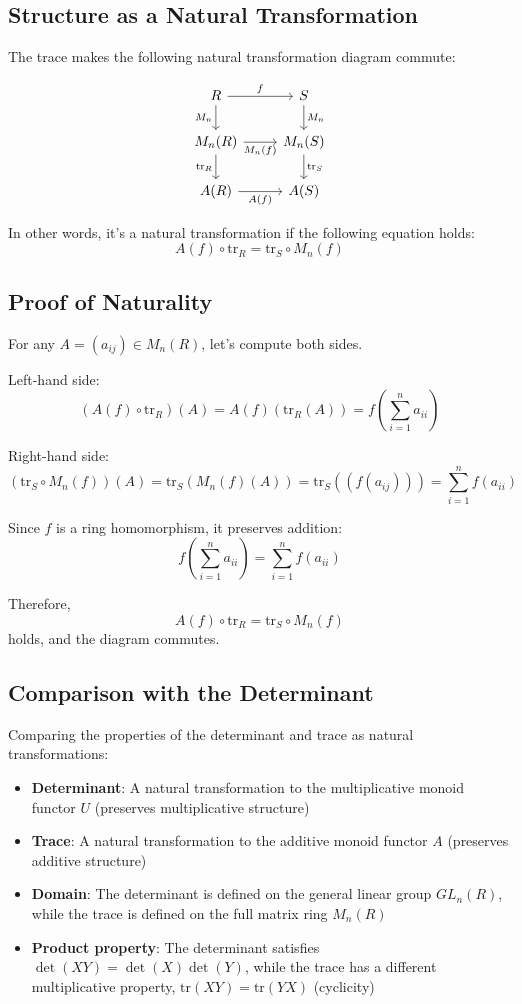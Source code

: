 \documentclass[uplatex,a4j,12pt,dvipdfmx]{jsarticle}
\begin{document}
\subsection{Structure as a Natural Transformation}

The trace makes the following natural transformation diagram commute:

\[
	\begin{tikzcd}
		R \arrow[r, "f"]
		\arrow[d, "M_n"']
		&
		S \arrow[d, "M_n"] \\
		M_n(R) \arrow[r, "M_n(f)"']
		\arrow[d, "\text{tr}_R"']
		&
		M_n(S) \arrow[d, "\text{tr}_S"] \\
		A(R) \arrow[r, "A(f)"']
		&
		A(S)
	\end{tikzcd}
\]

In other words, it's a natural transformation if the following equation holds:
\[
	A(f) \circ \text{tr}_R = \text{tr}_S \circ M_n(f)
\]

\subsection{Proof of Naturality}

For any $A = (a_{ij}) \in M_n(R)$, let's compute both sides.

Left-hand side:
\[
	(A(f) \circ \text{tr}_R)(A) = A(f)(\text{tr}_R(A)) = f\left(\sum_{i=1}^n a_{ii}\right)
\]

Right-hand side:
\[
	(\text{tr}_S \circ M_n(f))(A) = \text{tr}_S(M_n(f)(A)) = \text{tr}_S((f(a_{ij}))) = \sum_{i=1}^n f(a_{ii})
\]

Since $f$ is a ring homomorphism, it preserves addition:
\[
	f\left(\sum_{i=1}^n a_{ii}\right) = \sum_{i=1}^n f(a_{ii})
\]

Therefore,
\[
	A(f) \circ \text{tr}_R = \text{tr}_S \circ M_n(f)
\]
holds, and the diagram commutes.

\subsection{Comparison with the Determinant}

Comparing the properties of the determinant and trace as natural transformations:

\begin{itemize}
	\item \textbf{Determinant}: A natural transformation to the multiplicative monoid functor $U$ (preserves multiplicative structure)
	\item \textbf{Trace}: A natural transformation to the additive monoid functor $A$ (preserves additive structure)
	\item \textbf{Domain}: The determinant is defined on the general linear group $GL_n(R)$, while the trace is defined on the full matrix ring $M_n(R)$
	\item \textbf{Product property}: The determinant satisfies $\det(XY) = \det(X)\det(Y)$, while the trace has a different multiplicative property, $\text{tr}(XY) = \text{tr}(YX)$ (cyclicity)
\end{itemize}
\end{document}

